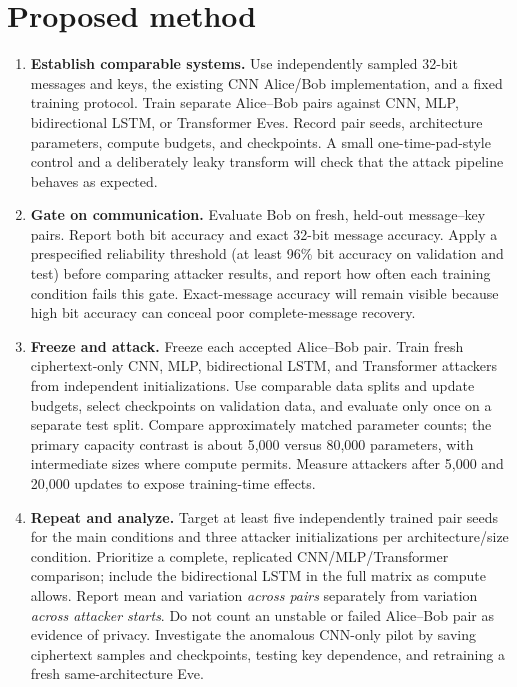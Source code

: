 \documentclass[10pt,letterpaper]{article}
\begin{document}
\section{Proposed method}
\begin{enumerate}
  \item \textbf{Establish comparable systems.} Use independently sampled 32-bit messages and keys, the existing CNN Alice/Bob implementation, and a fixed training protocol. Train separate Alice--Bob pairs against CNN, MLP, bidirectional LSTM, or Transformer Eves. Record pair seeds, architecture parameters, compute budgets, and checkpoints. A small one-time-pad-style control and a deliberately leaky transform will check that the attack pipeline behaves as expected.
  \item \textbf{Gate on communication.} Evaluate Bob on fresh, held-out message--key pairs. Report both bit accuracy and exact 32-bit message accuracy. Apply a prespecified reliability threshold (at least 96\% bit accuracy on validation and test) before comparing attacker results, and report how often each training condition fails this gate. Exact-message accuracy will remain visible because high bit accuracy can conceal poor complete-message recovery.
  \item \textbf{Freeze and attack.} Freeze each accepted Alice--Bob pair. Train fresh ciphertext-only CNN, MLP, bidirectional LSTM, and Transformer attackers from independent initializations. Use comparable data splits and update budgets, select checkpoints on validation data, and evaluate only once on a separate test split. Compare approximately matched parameter counts; the primary capacity contrast is about 5,000 versus 80,000 parameters, with intermediate sizes where compute permits. Measure attackers after 5,000 and 20,000 updates to expose training-time effects.
  \item \textbf{Repeat and analyze.} Target at least five independently trained pair seeds for the main conditions and three attacker initializations per architecture/size condition. Prioritize a complete, replicated CNN/MLP/Transformer comparison; include the bidirectional LSTM in the full matrix as compute allows. Report mean and variation \emph{across pairs} separately from variation \emph{across attacker starts}. Do not count an unstable or failed Alice--Bob pair as evidence of privacy. Investigate the anomalous CNN-only pilot by saving ciphertext samples and checkpoints, testing key dependence, and retraining a fresh same-architecture Eve.
\end{enumerate}
\end{document}
